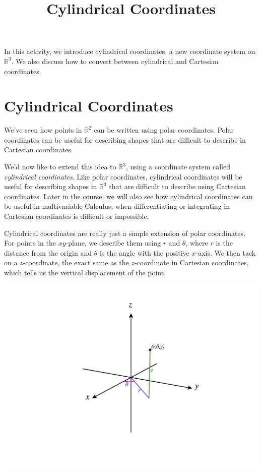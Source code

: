 \documentclass{ximera}
\title{Cylindrical Coordinates}
\begin{document}
\begin{abstract}
\end{abstract}
\maketitle

In this activity, we introduce cylindrical coordinates, a new coordinate system on $\mathbb{R}^3$. We also discuss how to convert between cylindrical and Cartesian coordinates.

\section*{Cylindrical Coordinates}

We've seen how points in $\mathbb{R}^2$ can be written using polar coordinates. Polar coordinates can be useful for describing shapes that are difficult to describe in Cartesian coordinates.

We'd now like to extend this idea to $\mathbb{R}^3$, using a coordinate system called \emph{cylindrical coordinates}. Like polar coordinates, cylindrical coordinates will be useful for describing shapes in $\mathbb{R}^3$ that are difficult to describe using Cartesian coordinates. Later in the course, we will also see how cylindrical coordinates can be useful in multivariable Calculus, when differentiating or integrating in Cartesian coordinates is difficult or impossible.

Cylindrical coordinates are really just a simple extension of polar coordinates. For points in the $xy$-plane, we describe them using $r$ and $\theta$, where $r$ is the distance from the origin and $\theta$ is the angle with the positive $x$-axis. We then tack on a $z$-coordinate, the exact same as the $z$-coordinate in Cartesian coordinates, which tells us the vertical displacement of the point.

\begin{image}
\includegraphics[width = \textwidth]{CalcPlot3D-cylindrical}
\end{image}
\end{document}
